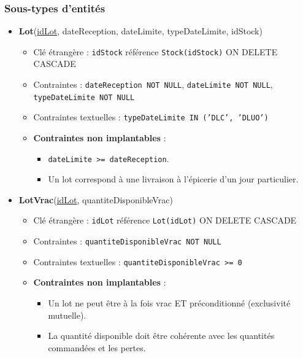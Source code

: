 \subsubsection{Sous-types d'entités}

\begin{itemize}
    \item \textbf{Lot}(\underline{idLot}, dateReception, dateLimite, typeDateLimite, idStock)
    \begin{itemize}
        \item Clé étrangère : \texttt{idStock} référence \texttt{Stock(idStock)} ON DELETE CASCADE
        \item Contraintes : \texttt{dateReception NOT NULL}, \texttt{dateLimite NOT NULL}, \texttt{typeDateLimite NOT NULL}
        \item Contraintes textuelles : \texttt{typeDateLimite IN ('DLC', 'DLUO')}
        \item \textbf{Contraintes non implantables} :
        \begin{itemize}
            \item \texttt{dateLimite >= dateReception}.
            \item Un lot correspond à une livraison à l'épicerie d'un jour particulier.
        \end{itemize}
    \end{itemize}
    
    \item \textbf{LotVrac}(\underline{idLot}, quantiteDisponibleVrac)
    \begin{itemize}
        \item Clé étrangère : \texttt{idLot} référence \texttt{Lot(idLot)} ON DELETE CASCADE
        \item Contraintes : \texttt{quantiteDisponibleVrac NOT NULL}
        \item Contraintes textuelles : \texttt{quantiteDisponibleVrac >= 0}
        \item \textbf{Contraintes non implantables} :
        \begin{itemize}
            \item Un lot ne peut être à la fois vrac ET préconditionné (exclusivité mutuelle).
            \item La quantité disponible doit être cohérente avec les quantités commandées et les pertes.
        \end{itemize}
    \end{itemize}
    

\end{itemize}
